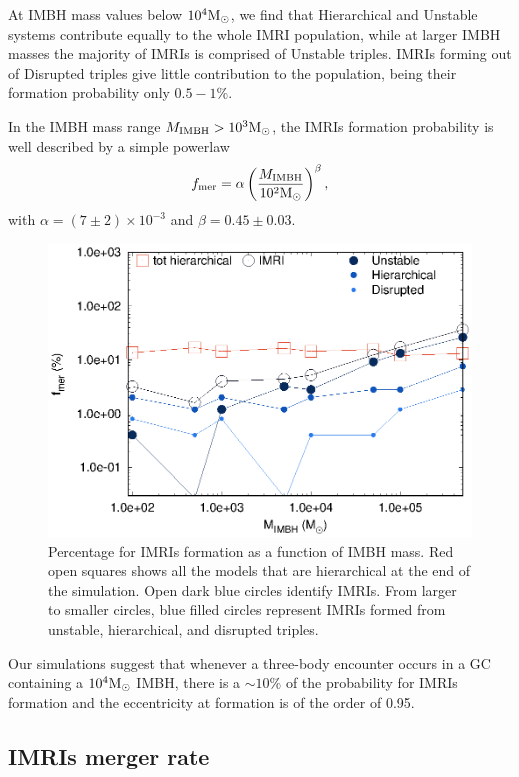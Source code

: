 \documentclass[useAMS,usenatbib]{mn2e}
\newcommand{\Ms}{{\rm M}_\odot}
\newcommand{\ibh}{{\rm IMBH}}
\begin{document}
At IMBH mass values below $10^4\Ms$, we find that Hierarchical and Unstable systems contribute equally to the whole IMRI population, while at larger IMBH masses the majority of IMRIs is comprised of Unstable triples. IMRIs forming out of Disrupted triples give little contribution to the population, being their formation probability only $0.5-1\%$.

In the IMBH mass range $M_\ibh>10^3\Ms$, the IMRIs formation probability is well described by a simple powerlaw
\begin{equation}
f_{\rm mer} = \alpha \left(\frac{M_\ibh}{10^2\Ms}\right)^\beta,
\label{fmerg}
\end{equation}  
with $\alpha = (7\pm2)\times 10^{-3}$ and $\beta = 0.45\pm0.03$. 

\begin{figure}
    \centering
    \includegraphics[width=\columnwidth]{mergers.eps}
    \caption{Percentage for IMRIs formation as a function of IMBH mass. Red open squares shows all the models that are hierarchical at the end of the simulation. Open dark blue circles identify IMRIs. From larger to smaller circles, blue filled circles represent IMRIs formed from unstable, hierarchical, and disrupted triples.}
    \label{fig:f5}
\end{figure}

Our simulations suggest that whenever a three-body encounter occurs in a GC containing a $10^4\Ms$ IMBH, there is a $\sim 10\%$ of the probability for IMRIs formation and the eccentricity at formation is of the order of 0.95. 

\subsection{IMRIs merger rate}
\end{document}
